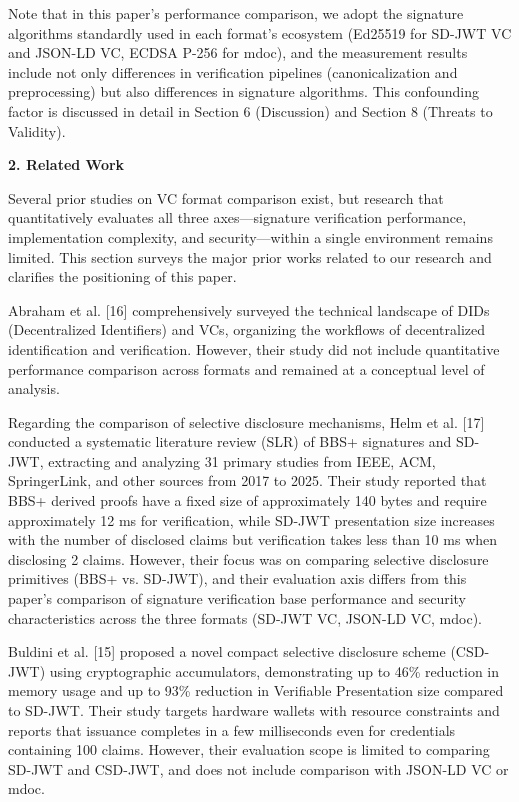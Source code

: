 Note that in this paper's performance comparison, we adopt the signature algorithms standardly used in each format's ecosystem (Ed25519 for SD-JWT VC and JSON-LD VC, ECDSA P-256 for mdoc), and the measurement results include not only differences in verification pipelines (canonicalization and preprocessing) but also differences in signature algorithms. This confounding factor is discussed in detail in Section 6 (Discussion) and Section 8 (Threats to Validity).

\textbf{2. Related Work}

Several prior studies on VC format comparison exist, but research that quantitatively evaluates all three axes---signature verification performance, implementation complexity, and security---within a single environment remains limited. This section surveys the major prior works related to our research and clarifies the positioning of this paper.

Abraham et al. {[}16{]} comprehensively surveyed the technical landscape of DIDs (Decentralized Identifiers) and VCs, organizing the workflows of decentralized identification and verification. However, their study did not include quantitative performance comparison across formats and remained at a conceptual level of analysis.

Regarding the comparison of selective disclosure mechanisms, Helm et al. {[}17{]} conducted a systematic literature review (SLR) of BBS+ signatures and SD-JWT, extracting and analyzing 31 primary studies from IEEE, ACM, SpringerLink, and other sources from 2017 to 2025. Their study reported that BBS+ derived proofs have a fixed size of approximately 140 bytes and require approximately 12 ms for verification, while SD-JWT presentation size increases with the number of disclosed claims but verification takes less than 10 ms when disclosing 2 claims. However, their focus was on comparing selective disclosure primitives (BBS+ vs. SD-JWT), and their evaluation axis differs from this paper's comparison of signature verification base performance and security characteristics across the three formats (SD-JWT VC, JSON-LD VC, mdoc).

Buldini et al. {[}15{]} proposed a novel compact selective disclosure scheme (CSD-JWT) using cryptographic accumulators, demonstrating up to 46\% reduction in memory usage and up to 93\% reduction in Verifiable Presentation size compared to SD-JWT. Their study targets hardware wallets with resource constraints and reports that issuance completes in a few milliseconds even for credentials containing 100 claims. However, their evaluation scope is limited to comparing SD-JWT and CSD-JWT, and does not include comparison with JSON-LD VC or mdoc.

